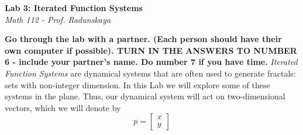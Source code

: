 \documentclass[12pt]{article}
\begin{document}
\pagestyle{empty}
\parskip=10pt
\def\xb{\bar{x}}
\begin{center}
{\Large \bf Lab 3: Iterated Function Systems}\\
{\it Math 112 -  Prof. Radunskaya} \\ 
\end{center}
{\bf Go through the lab with a partner.  (Each person should have their own computer if possible).  TURN IN THE ANSWERS TO NUMBER 6 - include your partner's name.
Do number 7 if you have time.}
\vskip 8pt
{\it Iterated Function Systems} are dynamical systems that are often used to generate fractals: sets with non-integer dimension.  In this Lab we will explore some of these systems in the plane.  Thus, our dynamical system will act on two-dimensional vectors, which we will denote by
$$ p = \left[\begin{array}{c}x \\y \end{array}\right] $$
\end{document}

